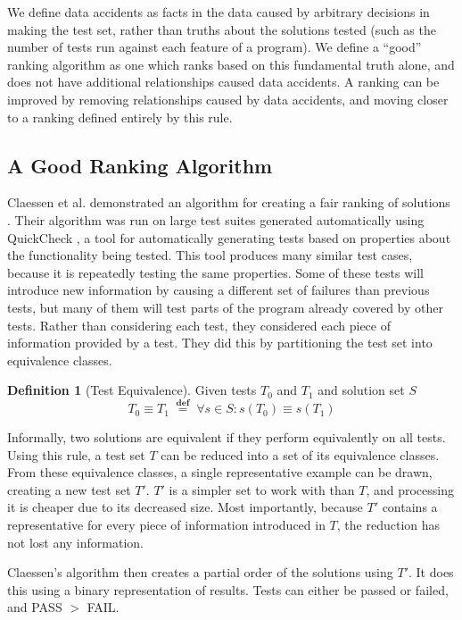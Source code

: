 \documentclass[11pt,twoside]{article}
\newcommand\defined{\mathrel{\;\stackrel{\scriptscriptstyle\mathbf{def}}{=}\;}}
\theoremstyle{definition}
\newtheorem{defn}{Definition}
\let\cite=\citep
\begin{document}
We define data accidents as facts in the data caused by arbitrary decisions in making the test set, rather than truths about the solutions tested (such as the number of tests run against each feature of a program). We define a ``good'' ranking algorithm as one which ranks based on this fundamental truth alone, and does not have additional relationships caused data accidents. A ranking can be improved by removing relationships caused by data accidents, and moving closer to a ranking defined entirely by this rule.

\subsection{A Good Ranking Algorithm}
Claessen et al. demonstrated an algorithm for creating a fair ranking of solutions \cite{Claessen}. Their algorithm was run on large test suites generated automatically using QuickCheck \cite{QuickCheck}, a tool for automatically generating tests based on properties about the functionality being tested. This tool produces many similar test cases, because it is repeatedly testing the same properties. Some of these tests will introduce new information by causing a different set of failures than previous tests, but many of them will test parts of the program already covered by other tests. Rather than considering each test, they considered each piece of information provided by a test. They did this by partitioning the test set into equivalence classes. 

\begin{defn}[Test Equivalence]
Given tests $T_0$ and $T_1$ and solution set $S$
$$ T_0 \equiv T_1 \defined \forall s \in S : s(T_0) \equiv s(T_1) $$
\end{defn}


Informally, two solutions are equivalent if they perform equivalently on all tests. Using this rule, a test set $T$ can be reduced into a set of its equivalence classes. From these equivalence classes, a single representative example can be drawn, creating a new test set $T'$. $T'$ is a simpler set to work with than $T$, and processing it is cheaper due to its decreased size. Most importantly, because $T'$ contains a representative for every piece of information introduced in $T$, the reduction has not lost any information.


Claessen's algorithm then creates a partial order of the solutions using $T'$. It does this using a binary representation of results. Tests can either be passed or failed, and PASS $>$ FAIL.
\end{document}
